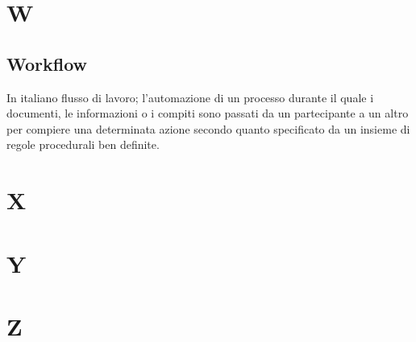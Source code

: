 \clearpage
\section*{W}

\subsection*{Workflow}
In italiano flusso di lavoro; l'automazione di un processo durante il quale i documenti, le informazioni o i compiti sono passati da un partecipante a un altro per compiere una determinata azione secondo quanto specificato da un insieme di regole procedurali ben definite.

\clearpage
\section*{X}

\clearpage
\section*{Y}

\clearpage
\section*{Z}